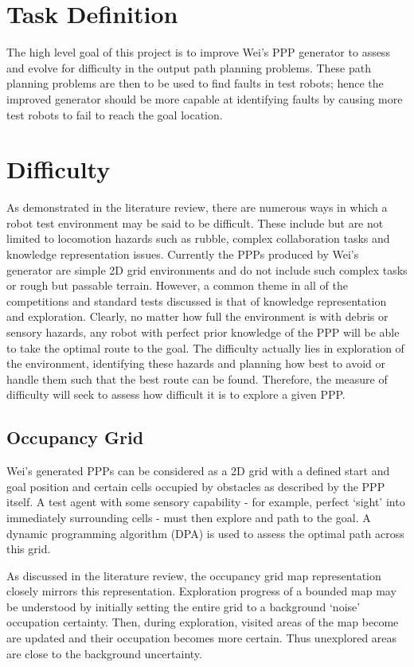 \documentclass[authoryearcitations]{UoYCSproject}
\begin{document}
\section{Task Definition}
\label{sec:pa2}
The high level goal of this project is to improve Wei’s PPP generator to assess and evolve for difficulty in the output path planning problems. These path planning problems are then to be used to find faults in test robots; hence the improved generator should be more capable at identifying faults by causing more test robots to fail to reach the goal location.

\section{Difficulty}
\label{sec:pa3}
As demonstrated in the literature review, there are numerous ways in which a robot test environment may be said to be difficult. These include but are not limited to locomotion hazards such as rubble, complex collaboration tasks and knowledge representation issues. Currently the PPPs produced by Wei’s generator are simple 2D grid environments and do not include such complex tasks or rough but passable terrain. However, a common theme in all of the competitions and standard tests discussed is that of knowledge representation and exploration. Clearly, no matter how full the environment is with debris or sensory hazards, any robot with perfect prior knowledge of the PPP will be able to take the optimal route to the goal. The difficulty actually lies in exploration of the environment, identifying these hazards and planning how best to avoid or handle them such that the best route can be found. Therefore, the measure of difficulty will seek to assess how difficult it is to explore a given PPP.

\subsection{Occupancy Grid}
\label{sec:pa3_occ_grid}
Wei’s generated PPPs can be considered as a 2D grid with a defined start and goal position and certain cells occupied by obstacles as described by the PPP itself. A test agent with some sensory capability - for example, perfect ‘sight’ into immediately surrounding cells - must then explore and path to the goal. A dynamic programming algorithm (DPA) is used to assess the optimal path across this grid.

As discussed in the literature review, the occupancy grid map representation closely mirrors this representation. Exploration progress of a bounded map may be understood by initially setting the entire grid to a background ‘noise’ occupation certainty. Then, during exploration, visited areas of the map become are updated and their occupation becomes more certain. Thus unexplored areas are close to the background uncertainty.
\end{document}

